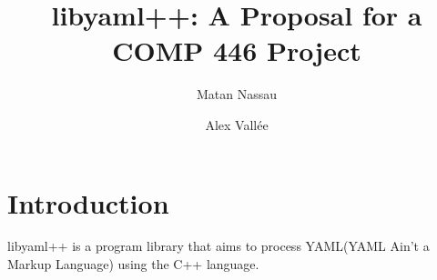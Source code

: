 \documentclass{article}
\author{Matan Nassau \and Alex Vall\'ee}
\title{libyaml++:  A Proposal for a COMP 446 Project}
\begin{document}
\maketitle
\section{Introduction}
libyaml++ is a program library that aims to process YAML(YAML Ain't a Markup
Language) using the C++ language.
\end{document}

